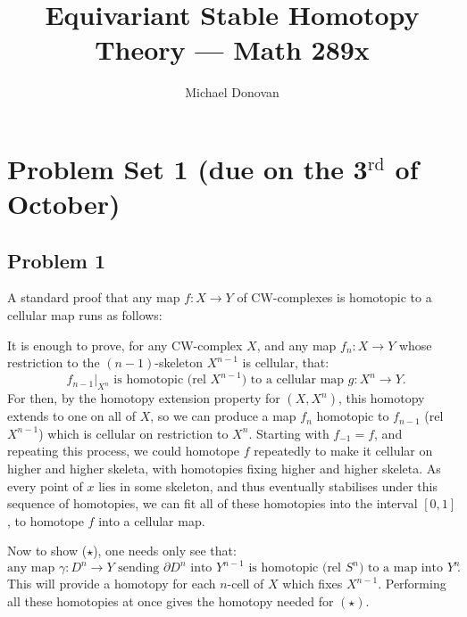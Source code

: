 \documentclass[11pt]{article}
\title{Equivariant Stable Homotopy Theory --- Math 289x}
\author{Michael Donovan}
\date{}
\newcommand{\NewLecture}[2]{\section*{#1 {\small(due #2)}}}
\begin{document}
\maketitle

\NewLecture{Problem Set 1}{on the 3$^\text{rd}$ of October}
\setcounter{section}{1}
\subsection*{Problem 1} A standard proof that any map $f:X\to Y$ of CW-complexes is homotopic to a cellular map runs as follows:

It is enough to prove, for any CW-complex $X$, and any map $f_n:X\to Y$ whose restriction to the $(n-1)$-skeleton $X^{n-1}$ is cellular, that:
\[\text{ $f_{n-1}|_{X^n}$ is homotopic (rel $X^{n-1}$) to a cellular map $g:X^n\to Y$.} \tag{$\star$}\]
For then, by the homotopy extension property for $(X,X^n)$, this homotopy extends to one on all of $X$, so we can produce a map $f_n$ homotopic to $f_{n-1}$ (rel $X^{n-1}$) which is cellular on restriction to $X^n$. Starting with $f_{-1}=f$, and repeating this process, we could homotope $f$ repeatedly to make it cellular on higher and higher skeleta, with homotopies fixing higher and higher skeleta. As every point of $x$ lies in some skeleton, and thus eventually stabilises under this sequence of homotopies, we can fit all of these homotopies into the interval $[0,1]$, to homotope $f$ into a cellular map.

Now to show ($\star$),
one needs only see that:
\[\tag{$\star\star$}
\text{any map $\gamma:D^n\to Y$ sending $\partial D^n$ into $Y^{n-1}$ is homotopic (rel $S^n$) to a map into $Y^n$}.
\]
This will provide a homotopy for each $n$-cell of $X$ which fixes $X^{n-1}$. Performing all these homotopies at once gives the homotopy needed for $(\star)$.
\end{document}
